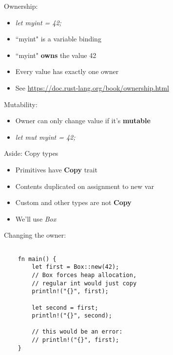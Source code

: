 \documentclass[aspectratio=169]{beamer}
\begin{document}
\begin{frame}
    Ownership:
    \begin{itemize}
        \item \textit{let myint = 42;}
        \item ``myint" is a variable binding
        \item ``myint" \textbf{owns} the value 42
        \item Every value has exactly one owner
        \item See \url{https://doc.rust-lang.org/book/ownership.html}
    \end{itemize}
\end{frame}

\begin{frame}
    Mutability:
    \begin{itemize}
        \item Owner can only change value if it's \textbf{mutable}
        \item \textit{let mut myint = 42;}
    \end{itemize}
\end{frame}

\begin{frame}[fragile]
    Aside: Copy types
    \begin{itemize}
        \item Primitives have \textbf{Copy} trait
        \item Contents duplicated on assignment to new var
        \item Custom and other types are not \textbf{Copy}
        \item We'll use \textit{Box}
    \end{itemize}
\end{frame}


\begin{frame}[fragile]
    Changing the owner:
\begin{verbatim}

    fn main() {
        let first = Box::new(42);
        // Box forces heap allocation,
        // regular int would just copy
        println!("{}", first);

        let second = first;
        println!("{}", second);

        // this would be an error:
        // println!("{}", first);
    }

\end{verbatim}

\end{frame}
\end{document}
